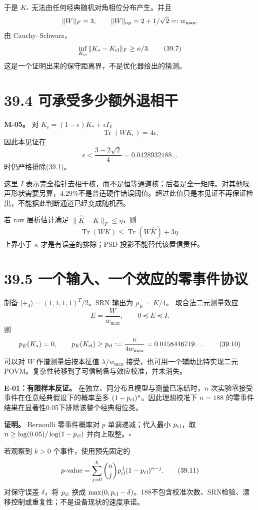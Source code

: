\documentclass[
  11pt,
  oneside]{book}
\begin{document}
于是 \(K_*\) 无法由任何经典随机对角相位分布产生。并且 \[
\|W\|_F=3,\qquad \|W\|_{\rm op}=2+1/\sqrt2=:w_{\max}.
\] 由 Cauchy--Schwarz， \[
\inf_{K_{\rm cl}}\|K_*-K_{\rm cl}\|_F\ge\kappa/3.
\tag{39.7}
\] 这是一个证明出来的保守距离界，不是优化器给出的猜测。

\section{39.4 可承受多少额外退相干}

\protect\hypertarget{m-05}{}{}

\textbf{M-05。} 对 \(K_\epsilon=(1-\epsilon)K_*+\epsilon I\)， \[
\operatorname{Tr}(WK_\epsilon)=4\epsilon.
\] 因此本见证在 \[
\epsilon<\frac{3-2\sqrt2}{4}=0.0428932188\ldots
\tag{39.8}
\] 时仍严格排除(39.1)。

这里 \(I\)
表示完全指针去相干核，而不是恒等通道核；后者是全一矩阵。对其他噪声形状需要另算，4.29\%不是普适硬件错误阈值。超过此值只是本见证不再保证检出，不能据此判断通道已经变成随机酉。

若 raw 层析估计满足 \(\|\widehat K-K\|_F\le\eta\)，则 \[
\operatorname{Tr}(WK)\le \operatorname{Tr}(W\widehat K)+3\eta.
\] 上界小于 \(\kappa\) 才是有误差的排除；PSD 投影不能替代该置信责任。

\section{39.5 一个输入、一个效应的零事件协议}

制备 \(|+\!_4\rangle=(1,1,1,1)^T/2\)。SRN 输出为 \(\rho_K=K/4\)。
取合法二元测量效应 \[
E=\frac{W}{w_{\max}},\qquad 0\preceq E\preceq I.
\tag{39.9}
\] 则 \[
p_E(K_*)=0,\qquad
p_E(K_{\rm cl})\ge
p_{\rm cl}:=\frac{\kappa}{4w_{\max}}
=0.0158446719\ldots
\tag{39.10}
\] 可以对 \(W\) 作谱测量后按本征值 \(\lambda/w_{\max}\)
接受，也可用一个辅助比特实现二元
POVM。复杂性转移到了可信制备与效应校准，并未消失。

\protect\hypertarget{e-01}{}{}

\textbf{E-01：有限样本反证。} 在独立、同分布且模型与测量已冻结时，\(n\)
次实验零接受事件在任意经典假设下的概率至多
\((1-p_{\rm cl})^n\)。因此理想校准下 \(n=188\)
的零事件结果在显著性0.05下排除该整个经典相位类。

\textbf{证明。} Bernoulli 零事件概率对 \(p\) 单调递减；代入最小
\(p_{\rm cl}\)，取 \(n\ge\log(0.05)/\log(1-p_{\rm cl})\)
并向上取整。\(\square\)

若观察到 \(k>0\) 个事件，使用预先固定的 \[
p\text{-value}=\sum_{j=0}^k{n\choose j}p_{\rm cl}^{\,j}(1-p_{\rm cl})^{n-j}.
\tag{39.11}
\] 对保守误差 \(\delta\)，将 \(p_{\rm cl}\) 换成
\(\max(0,p_{\rm cl}-\delta)\)。188不包含校准次数、SRN检验、漂移控制或重复性；不是设备现状的速度承诺。
\end{document}
